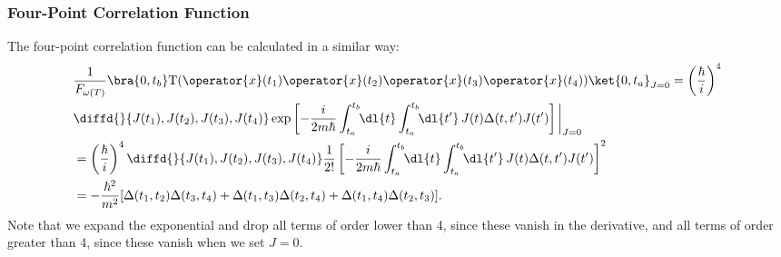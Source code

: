 \documentclass[fleqn]{NotesClass}
\newcommand*{\timeorder}{\mathrm{T}}
\begin{document}
    \subsubsection{Four-Point Correlation Function}
    The four-point correlation function can be calculated in a similar way:
    \begin{align}
        &\frac{1}{F_{\omega(T)}}\bra{0, t_b} \timeorder(\operator{x}(t_1)\operator{x}(t_2)\operator{x}(t_3)\operator{x}(t_4)) \ket{0, t_a}_{J=0} = \left( \frac{\hbar}{i} \right)^{4}\\
        &\diffd{}{J(t_1),J(t_2),J(t_3),J(t_4)} \exp\left[ -\frac{i}{2m\hbar} \int_{t_a}^{t_b} \!\! \dl{t} \int_{t_a}^{t_b} \!\! \dl{t'} \, J(t)\Delta(t, t')J(t') \right] \bigg\vert_{J=0}\notag\\
        &= \left( \frac{\hbar}{i} \right)^{4} \diffd{}{J(t_1),J(t_2),J(t_3),J(t_4)} \frac{1}{2!}\left[ -\frac{i}{2m\hbar} \int_{t_a}^{t_b} \!\! \dl{t} \int_{t_a}^{t_b} \!\! \dl{t'} \, J(t)\Delta(t, t')J(t') \right]^2\notag\\
        &= -\frac{\hbar^2}{m^2} [\Delta(t_1, t_2) \Delta(t_3, t_4) + \Delta(t_1, t_3)\Delta(t_2, t_4) + \Delta(t_1, t_4)\Delta(t_2, t_3)].
    \end{align}
    Note that we expand the exponential and drop all terms of order lower than 4, since these vanish in the derivative, and all terms of order greater than 4, since these vanish when we set \(J = 0\).
    
\end{document}

